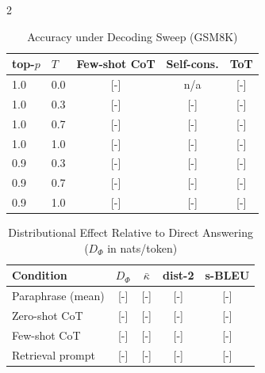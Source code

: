 \documentclass{article}
\begin{document}
\begin{multicols}{2}
\begin{table}[H]
\caption{Accuracy under Decoding Sweep (GSM8K)}
\centering
\small
\begin{tabular}{llccc}
\toprule
\textbf{top-$p$} & \textbf{$T$} & \textbf{Few-shot CoT} & \textbf{Self-cons.} & \textbf{ToT} \\
\midrule
1.0 & 0.0 & \textcolor{BrickRed}{[-]} & n/a & \textcolor{BrickRed}{[-]} \\
1.0 & 0.3 & \textcolor{BrickRed}{[-]} & \textcolor{BrickRed}{[-]} & \textcolor{BrickRed}{[-]} \\
1.0 & 0.7 & \textcolor{BrickRed}{[-]} & \textcolor{BrickRed}{[-]} & \textcolor{BrickRed}{[-]} \\
1.0 & 1.0 & \textcolor{BrickRed}{[-]} & \textcolor{BrickRed}{[-]} & \textcolor{BrickRed}{[-]} \\
0.9 & 0.3 & \textcolor{BrickRed}{[-]} & \textcolor{BrickRed}{[-]} & \textcolor{BrickRed}{[-]} \\
0.9 & 0.7 & \textcolor{BrickRed}{[-]} & \textcolor{BrickRed}{[-]} & \textcolor{BrickRed}{[-]} \\
0.9 & 1.0 & \textcolor{BrickRed}{[-]} & \textcolor{BrickRed}{[-]} & \textcolor{BrickRed}{[-]} \\
\bottomrule
\end{tabular}
\end{table}

\begin{table}[H]
\caption{Distributional Effect Relative to Direct Answering ($D_{\Phi}$ in nats/token)}
\centering
\small
\begin{tabular}{lcccc}
\toprule
\textbf{Condition} & \textbf{$D_{\Phi}$} & \textbf{$\bar{\kappa}$} & \textbf{dist-2} & \textbf{s-BLEU} \\
\midrule
Paraphrase (mean) & \textcolor{BrickRed}{[-]} & \textcolor{BrickRed}{[-]} & \textcolor{BrickRed}{[-]} & \textcolor{BrickRed}{[-]} \\
Zero-shot CoT & \textcolor{BrickRed}{[-]} & \textcolor{BrickRed}{[-]} & \textcolor{BrickRed}{[-]} & \textcolor{BrickRed}{[-]} \\
Few-shot CoT & \textcolor{BrickRed}{[-]} & \textcolor{BrickRed}{[-]} & \textcolor{BrickRed}{[-]} & \textcolor{BrickRed}{[-]} \\
Retrieval prompt & \textcolor{BrickRed}{[-]} & \textcolor{BrickRed}{[-]} & \textcolor{BrickRed}{[-]} & \textcolor{BrickRed}{[-]} \\
\bottomrule
\end{tabular}
\end{table}


\end{multicols}
\end{document}
